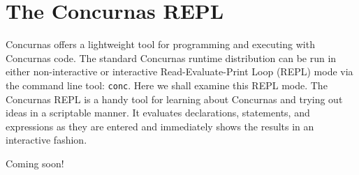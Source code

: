\documentclass[conc-doc]{subfiles}
\begin{document}
	\chapter[The Concurnas REPL]{The Concurnas REPL}
	\label{ch:repl}

Concurnas offers a lightweight tool for programming and executing with Concurnas code. The standard Concurnas runtime distribution can be run in either non-interactive or interactive Read-Evaluate-Print Loop (REPL) mode via the command line tool: \lstinline{conc}. Here we shall examine this REPL mode. The Concurnas REPL is a handy tool for learning about Concurnas and trying out ideas in a scriptable manner. It evaluates declarations, statements, and expressions as they are entered and immediately shows the results in an interactive fashion.	

Coming soon!
\end{document}
